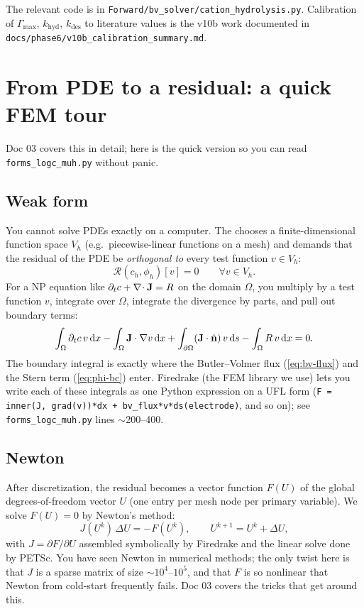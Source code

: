 \documentclass[11pt]{article}
\begin{document}
The relevant code is in
\texttt{Forward/bv\_solver/cation\_hydrolysis.py}. Calibration of
$\Gamma_{\max}$, $k_{\mathrm{hyd}}$, $k_{\mathrm{des}}$ to literature
values is the v10b work documented in
\texttt{docs/phase6/v10b\_calibration\_summary.md}.

\section{From PDE to a residual: a quick FEM tour}

Doc 03 covers this in detail; here is the quick version so you can
read \texttt{forms\_logc\_muh.py} without panic.

\subsection{Weak form}

You cannot solve PDEs exactly on a computer. The
 chooses a finite-dimensional
function space $V_h$ (e.g.\ piecewise-linear functions on a mesh) and
demands that the residual of the PDE be \emph{orthogonal to} every
test function $v \in V_h$:
\[
  \mathcal R(c_h, \phi_h)[v] = 0 \qquad \forall v \in V_h.
\]
For a NP equation like $\partial_t c + \nabla\!\cdot \mathbf{J} = R$ on the
domain $\Omega$, you multiply by a test function $v$, integrate
over $\Omega$, integrate the divergence by parts, and pull out
boundary terms:
\[
  \int_\Omega \partial_t c \, v \,\mathrm{d} x
  - \int_\Omega \mathbf{J}\cdot \nabla v \,\mathrm{d} x
  + \int_{\partial\Omega} (\mathbf{J}\cdot \hat{\mathbf{n}})\, v \,\mathrm{d} s
  - \int_\Omega R\, v\, \mathrm{d} x = 0.
\]
The boundary integral is exactly where the Butler--Volmer flux
(\ref{eq:bv-flux}) and the Stern term (\ref{eq:phi-bc}) enter.
Firedrake (the FEM library we use) lets you write each of these
integrals as one Python expression on a UFL form
(\texttt{F = inner(J, grad(v))*dx + bv\_flux*v*ds(electrode)}, and
so on); see \texttt{forms\_logc\_muh.py} lines $\sim$200--400.

\subsection{Newton}

After discretization, the residual becomes a vector function $F(U)$
of the global degrees-of-freedom vector $U$ (one entry per mesh node
per primary variable). We solve $F(U) = 0$ by Newton's method:
\[
  J(U^k) \,\Delta U = -F(U^k), \qquad U^{k+1} = U^k + \Delta U,
\]
with $J = \partial F/\partial U$ assembled symbolically by Firedrake
and the linear solve done by PETSc. You have seen Newton in
numerical methods; the only twist here is that $J$ is a sparse
matrix of size $\sim$$10^4$--$10^5$, and that $F$ is so nonlinear
that Newton from cold-start frequently fails. Doc 03 covers the
 tricks that get around this.
\end{document}
